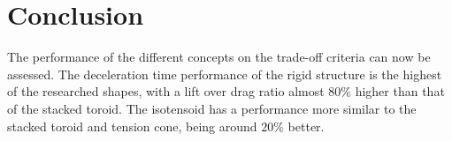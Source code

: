 \section{Conclusion}
The performance of the different concepts on the trade-off criteria can now be assessed. The deceleration time performance of the rigid structure is the highest of the researched shapes, with a lift over drag ratio almost $80\%$ higher than that of the stacked toroid. The isotensoid has a performance more similar to the stacked toroid and tension cone, being around $20\%$ better.



